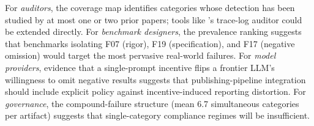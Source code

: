 For \emph{auditors}, the coverage map identifies categories whose detection has been studied by at most one or two prior papers; tools like \citet{luo2025hidden}'s trace-log auditor could be extended directly. For \emph{benchmark designers}, the prevalence ranking suggests that benchmarks isolating F07 (rigor), F19 (specification), and F17 (negative omission) would target the most pervasive real-world failures. For \emph{model providers}, \probeA evidence that a single-prompt incentive flips a frontier LLM's willingness to omit negative results suggests that publishing-pipeline integration should include explicit policy against incentive-induced reporting distortion. For \emph{governance}, the compound-failure structure (mean 6.7 simultaneous categories per artifact) suggests that single-category compliance regimes will be insufficient.
